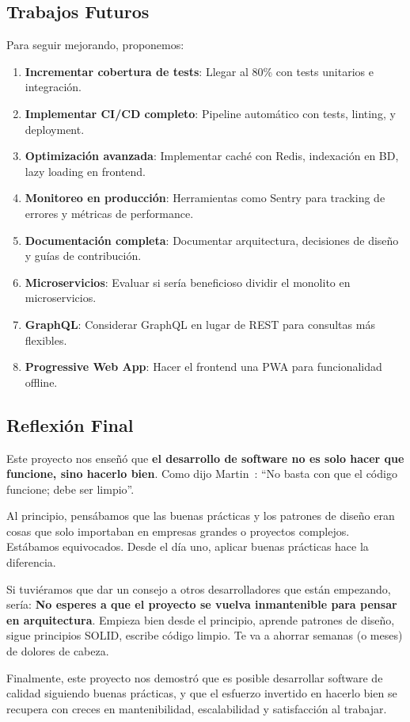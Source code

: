 \subsection{Trabajos Futuros}

Para seguir mejorando, proponemos:

\begin{enumerate}
    \item \textbf{Incrementar cobertura de tests}: Llegar al 80\% con tests unitarios e integración.
    
    \item \textbf{Implementar CI/CD completo}: Pipeline automático con tests, linting, y deployment.
    
    \item \textbf{Optimización avanzada}: Implementar caché con Redis, indexación en BD, lazy loading en frontend.
    
    \item \textbf{Monitoreo en producción}: Herramientas como Sentry para tracking de errores y métricas de performance.
    
    \item \textbf{Documentación completa}: Documentar arquitectura, decisiones de diseño y guías de contribución.
    
    \item \textbf{Microservicios}: Evaluar si sería beneficioso dividir el monolito en microservicios.
    
    \item \textbf{GraphQL}: Considerar GraphQL en lugar de REST para consultas más flexibles.
    
    \item \textbf{Progressive Web App}: Hacer el frontend una PWA para funcionalidad offline.
\end{enumerate}

\subsection{Reflexión Final}

Este proyecto nos enseñó que \textbf{el desarrollo de software no es solo hacer que funcione, sino hacerlo bien}. Como dijo Martin~\cite{martin2008clean}: ``No basta con que el código funcione; debe ser limpio''.

Al principio, pensábamos que las buenas prácticas y los patrones de diseño eran cosas que solo importaban en empresas grandes o proyectos complejos. Estábamos equivocados. Desde el día uno, aplicar buenas prácticas hace la diferencia.

Si tuviéramos que dar un consejo a otros desarrolladores que están empezando, sería: \textbf{No esperes a que el proyecto se vuelva inmantenible para pensar en arquitectura}. Empieza bien desde el principio, aprende patrones de diseño, sigue principios SOLID, escribe código limpio. Te va a ahorrar semanas (o meses) de dolores de cabeza.

Finalmente, este proyecto nos demostró que es posible desarrollar software de calidad siguiendo buenas prácticas, y que el esfuerzo invertido en hacerlo bien se recupera con creces en mantenibilidad, escalabilidad y satisfacción al trabajar.
